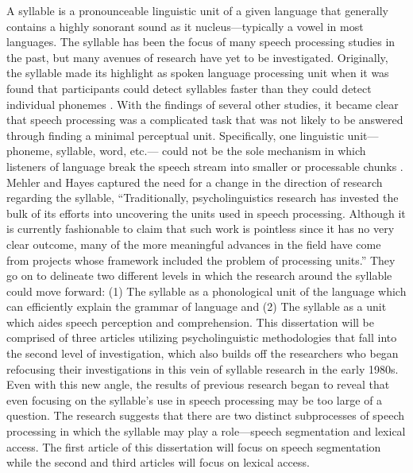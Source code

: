 A syllable is a pronounceable linguistic unit of a given language that generally contains a highly sonorant sound as it nucleus—typically a vowel in most languages. The syllable has been the focus of many speech processing studies in the past, but many avenues of research have yet to be investigated. Originally, the syllable made its highlight as spoken language processing unit when it was found that participants could detect syllables faster than they could detect individual phonemes \citep*{Savin1970-oy}. With the findings of several other studies, it became clear that speech processing was a complicated task that was not likely to be answered through finding a minimal perceptual unit. Specifically, one linguistic unit—phoneme, syllable, word, etc.— could not be the sole mechanism in which listeners of language break the speech stream into smaller or processable chunks \citep{Foss1973-ll,Healy1976-js,McNeill1973-bo}. Mehler and Hayes \parencite*{Mehler1981-wp} captured the need for a change in the direction of research regarding the syllable, “Traditionally, psycholinguistics research has invested the bulk of its efforts into uncovering the units used in speech processing. Although it is currently fashionable to claim that such work is pointless since it has no very clear outcome, many of the more meaningful advances in the field have come from projects whose framework included the problem of processing units.” They go on to delineate two different levels in which the research around the syllable could move forward: (1) The syllable as a phonological unit of the language which can efficiently explain the grammar of language and (2) The syllable as a unit which aides speech perception and comprehension. This dissertation will be comprised of three articles utilizing psycholinguistic methodologies that fall into the second level of investigation, which also builds off the researchers who began refocusing their investigations in this vein of syllable research in the early 1980s. Even with this new angle, the results of previous research began to reveal that even focusing on the syllable’s use in speech processing may be too large of a question. The research suggests that there are two distinct subprocesses of speech processing in which the syllable may play a role—speech segmentation and lexical access. The first article of this dissertation will focus on speech segmentation while the second and third articles will focus on lexical access.


